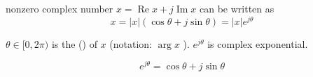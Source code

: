 \begin{theorem}
    nonzero complex number $ x=\operatorname{Re} x+{j} \operatorname{Im} x $ can be written as
\begin{equation}
x=|x|(\cos \theta+{j} \sin \theta)=|x| e^{{j} \theta}
\end{equation}

$ \theta \in[0,2 \pi) $ is the  () of $ x $ (notation: $ \arg x $ ). $ e^{{j} \theta} $ is complex exponential.
\end{theorem}

\begin{theorem}
    \begin{equation} e^{{j} \theta}=\cos \theta+{j} \sin \theta \end{equation}
\end{theorem}

